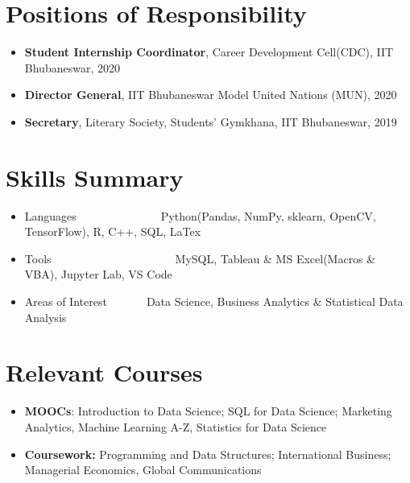 \documentclass[a4paper,20pt]{article}
\newcommand{\resumeItem}[2]{
  \item\small{
    {#1}{#2 \vspace{-2pt}}
  }
}
\newcommand{\resumeSubItem}[2]{\resumeItem{#1}{#2}\vspace{-2pt}}
\newcommand{\resumeSubHeadingListStart}{\begin{itemize}[leftmargin=*]}
\newcommand{\resumeSubHeadingListEnd}{\end{itemize}}
\begin{document}
\section{Positions of Responsibility}
\begin{itemize}[leftmargin=*]
\item {\textbf{Student Internship Coordinator}, Career Development Cell(CDC), IIT Bhubaneswar, 2020}
\vspace{-5.5pt}
\item {\textbf{Director General}, IIT Bhubaneswar Model United Nations (MUN), 2020}
\vspace{-5.5pt}
\item {\textbf{Secretary}, Literary Society, Students’ Gymkhana, IIT Bhubaneswar, 2019}
\vspace{-5pt}
\end{itemize}
\section{Skills Summary}
	\resumeSubHeadingListStart
	\resumeSubItem{Languages}{~~~~~~~~~~~~~~~Python(Pandas, NumPy, sklearn, OpenCV, TensorFlow), R, C++, SQL, LaTex}
	\vspace{-2.5pt}
	\resumeSubItem{Tools}{~~~~~~~~~~~~~~~~~~~~~~MySQL, Tableau \& MS Excel(Macros \& VBA), Jupyter Lab, VS Code }
	\vspace{-3pt}
	\resumeSubItem{Areas of Interest}{~~~~~~~Data Science, Business Analytics \& Statistical Data Analysis}
\vspace{-1pt}
\resumeSubHeadingListEnd
\section{Relevant Courses}
\begin{itemize}[leftmargin=*]
\item {\textbf{\small{MOOCs}}: Introduction to Data Science; SQL for Data Science; Marketing Analytics, Machine Learning A-Z, Statistics for Data Science}
\vspace{-6pt}
\item {\textbf{\small{Coursework:}} Programming and Data Structures; International Business; Managerial Economics, Global Communications}

\vspace{-5pt}
\end{itemize}

\end{document}
